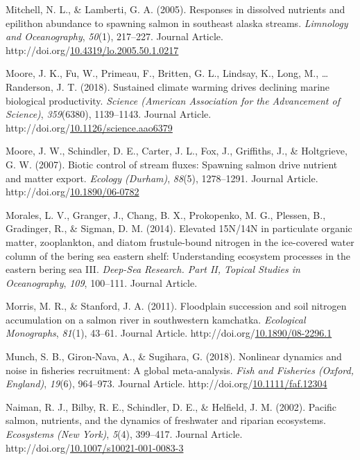 \documentclass [11pt, proquest] {uwthesis}[2015/03/03]
\newlength{\cslhangindent}
\newenvironment{CSLReferences}%
{\setlength{\parindent}{0pt}%
\everypar{\setlength{\hangindent}{\cslhangindent}}\ignorespaces}%
{\par}
\begin{document}
\begin{CSLReferences}{1}{0}
\leavevmode\hypertarget{ref-Mitchell2005}{}%
Mitchell, N. L., \& Lamberti, G. A. (2005). Responses in dissolved nutrients and epilithon abundance to spawning salmon in southeast alaska streams. \emph{Limnology and Oceanography}, \emph{50}(1), 217--227. Journal Article. http://doi.org/\href{https://doi.org/10.4319/lo.2005.50.1.0217}{10.4319/lo.2005.50.1.0217}

\leavevmode\hypertarget{ref-Moore2018}{}%
Moore, J. K., Fu, W., Primeau, F., Britten, G. L., Lindsay, K., Long, M., \ldots{} Randerson, J. T. (2018). Sustained climate warming drives declining marine biological productivity. \emph{Science (American Association for the Advancement of Science)}, \emph{359}(6380), 1139--1143. Journal Article. http://doi.org/\href{https://doi.org/10.1126/science.aao6379}{10.1126/science.aao6379}

\leavevmode\hypertarget{ref-Moore2007}{}%
Moore, J. W., Schindler, D. E., Carter, J. L., Fox, J., Griffiths, J., \& Holtgrieve, G. W. (2007). Biotic control of stream fluxes: Spawning salmon drive nutrient and matter export. \emph{Ecology (Durham)}, \emph{88}(5), 1278--1291. Journal Article. http://doi.org/\href{https://doi.org/10.1890/06-0782}{10.1890/06-0782}

\leavevmode\hypertarget{ref-Morales2014}{}%
Morales, L. V., Granger, J., Chang, B. X., Prokopenko, M. G., Plessen, B., Gradinger, R., \& Sigman, D. M. (2014). Elevated 15N/14N in particulate organic matter, zooplankton, and diatom frustule-bound nitrogen in the ice-covered water column of the bering sea eastern shelf: Understanding ecosystem processes in the eastern bering sea III. \emph{Deep-Sea Research. Part II, Topical Studies in Oceanography}, \emph{109}, 100--111. Journal Article.

\leavevmode\hypertarget{ref-Morris2011}{}%
Morris, M. R., \& Stanford, J. A. (2011). Floodplain succession and soil nitrogen accumulation on a salmon river in southwestern kamchatka. \emph{Ecological Monographs}, \emph{81}(1), 43--61. Journal Article. http://doi.org/\href{https://doi.org/10.1890/08-2296.1}{10.1890/08-2296.1}

\leavevmode\hypertarget{ref-Munch2018}{}%
Munch, S. B., Giron‐Nava, A., \& Sugihara, G. (2018). Nonlinear dynamics and noise in fisheries recruitment: A global meta‐analysis. \emph{Fish and Fisheries (Oxford, England)}, \emph{19}(6), 964--973. Journal Article. http://doi.org/\href{https://doi.org/10.1111/faf.12304}{10.1111/faf.12304}

\leavevmode\hypertarget{ref-Naiman2002}{}%
Naiman, R. J., Bilby, R. E., Schindler, D. E., \& Helfield, J. M. (2002). Pacific salmon, nutrients, and the dynamics of freshwater and riparian ecosystems. \emph{Ecosystems (New York)}, \emph{5}(4), 399--417. Journal Article. http://doi.org/\href{https://doi.org/10.1007/s10021-001-0083-3}{10.1007/s10021-001-0083-3}


\end{CSLReferences}
\end{document}
